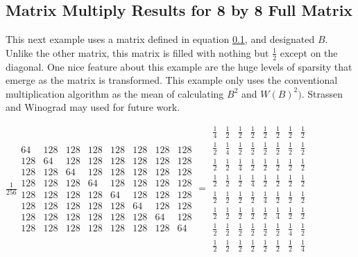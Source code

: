 \documentclass{article}
\begin{document}
\subsection{Matrix Multiply Results for 8 by 8 Full Matrix}
This next example uses a matrix defined in equation \ref{}, and designated $B$.  Unlike the other matrix, this matrix is filled with nothing but $\frac{1}{2}$ except on the diagonal.  One nice feature about this example are the huge levels of sparsity that emerge as the matrix is transformed.   This example only uses the conventional multiplication algorithm as the mean of calculating $B^2$ and $W(B)^2)$.  Strassen and Winograd may used for future work.  

$\frac{1}{256} 
\begin{array}{cccccccc}
64 & 128 & 128 & 128 & 128 & 128 & 128 & 128 \\ 
128 & 64 & 128 & 128 & 128 & 128 & 128 & 128 \\ 
128 & 128 & 64 & 128 & 128 & 128 & 128 & 128 \\ 
128 & 128 & 128 & 64 & 128 & 128 & 128 & 128 \\ 
128 & 128 & 128 & 128 & 64 & 128 & 128 & 128 \\ 
128 & 128 & 128 & 128 & 128 & 64 & 128 & 128 \\ 
128 & 128 & 128 & 128 & 128 & 128 & 64 & 128 \\ 
128 & 128 & 128 & 128 & 128 & 128 & 128 & 64
\end{array}
=\allowbreak 
\begin{array}{cccccccc}
\frac{1}{4} & \frac{1}{2} & \frac{1}{2} & \frac{1}{2} & \frac{1}{2} & \frac{1%
}{2} & \frac{1}{2} & \frac{1}{2} \\ 
\frac{1}{2} & \frac{1}{4} & \frac{1}{2} & \frac{1}{2} & \frac{1}{2} & \frac{1%
}{2} & \frac{1}{2} & \frac{1}{2} \\ 
\frac{1}{2} & \frac{1}{2} & \frac{1}{4} & \frac{1}{2} & \frac{1}{2} & \frac{1%
}{2} & \frac{1}{2} & \frac{1}{2} \\ 
\frac{1}{2} & \frac{1}{2} & \frac{1}{2} & \frac{1}{4} & \frac{1}{2} & \frac{1%
}{2} & \frac{1}{2} & \frac{1}{2} \\ 
\frac{1}{2} & \frac{1}{2} & \frac{1}{2} & \frac{1}{2} & \frac{1}{4} & \frac{1%
}{2} & \frac{1}{2} & \frac{1}{2} \\ 
\frac{1}{2} & \frac{1}{2} & \frac{1}{2} & \frac{1}{2} & \frac{1}{2} & \frac{1%
}{4} & \frac{1}{2} & \frac{1}{2} \\ 
\frac{1}{2} & \frac{1}{2} & \frac{1}{2} & \frac{1}{2} & \frac{1}{2} & \frac{1%
}{2} & \frac{1}{4} & \frac{1}{2} \\ 
\frac{1}{2} & \frac{1}{2} & \frac{1}{2} & \frac{1}{2} & \frac{1}{2} & \frac{1%
}{2} & \frac{1}{2} & \frac{1}{4}
\end{array}
\allowbreak $
\end{document}
